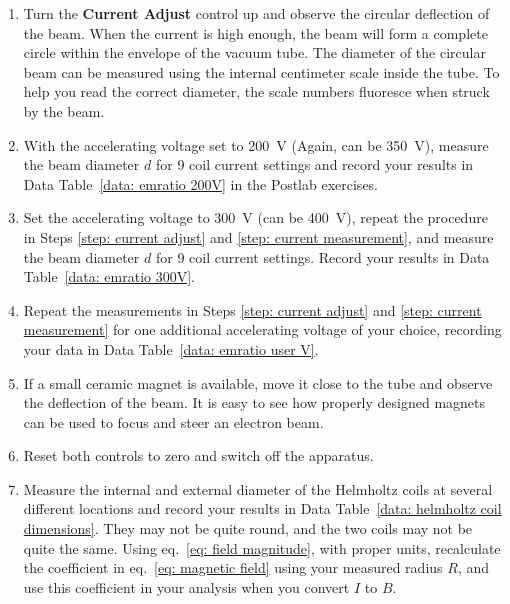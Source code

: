 \documentclass[addpoints]{physlabs}
\begin{document}
\begin{labsection}
\begin{experiment}
\begin{enumerate}
        Note: the Voltage and Current outputs are controlled by an onboard microprocessor that automatically locks out the controls at both the minimum and maximum settings. As a result, when the knob reaches the minimum or maximum setting, it will still turn, but the value shown on the corresponding display will not change. This feature prevents excessive loads from being placed on the tube and provides a smooth, jitter-free display.

        \item Turn the \textbf{Current Adjust} control up and observe the circular deflection of the beam. When the current is high enough, the beam will form a complete circle within the envelope of the vacuum tube. The diameter of the circular beam can be measured using the internal centimeter scale inside the tube. To help you read the correct diameter, the scale numbers fluoresce when struck by the beam. \label{step: current adjust}

        \item With the accelerating voltage set to \qty{200}{\volt}{\color{red}  (Again, can be \qty{350}{\volt})}, measure the beam diameter $d$ for 9 coil current settings and record your results in Data Table~\ref{data: emratio 200V} in the Postlab exercises. \label{step: current measurement}
        
        \item Set the accelerating voltage to \qty{300}{\volt}{\color{red}  (can be \qty{400}{\volt})}, repeat the procedure in Steps \ref{step: current adjust} and \ref{step: current measurement}, and measure the beam diameter $d$ for 9 coil current settings. Record your results in Data Table~\ref{data: emratio 300V}.
        
        \item Repeat the measurements in Steps \ref{step: current adjust} and \ref{step: current measurement} for one additional accelerating voltage of your choice, recording your data in Data Table~\ref{data: emratio user V}.
        
        \item If a small ceramic magnet is available, move it close to the tube and observe the deflection of the beam. It is easy to see how properly designed magnets can be used to focus and steer an electron beam.
        
        \item Reset both controls to zero and switch off the apparatus.
        
        \item Measure the internal and external diameter of the Helmholtz coils at several different locations and record your results in Data Table~\ref{data: helmholtz coil dimensions}. They may not be quite round, and the two coils may not be quite the same. Using eq.~\ref{eq: field magnitude}, with proper units, recalculate the coefficient in eq.~\ref{eq: magnetic field} using your measured radius $R$, and use this coefficient in your analysis when you convert $I$ to $B$.


\end{enumerate}
\end{experiment}
\end{labsection}
\end{document}
